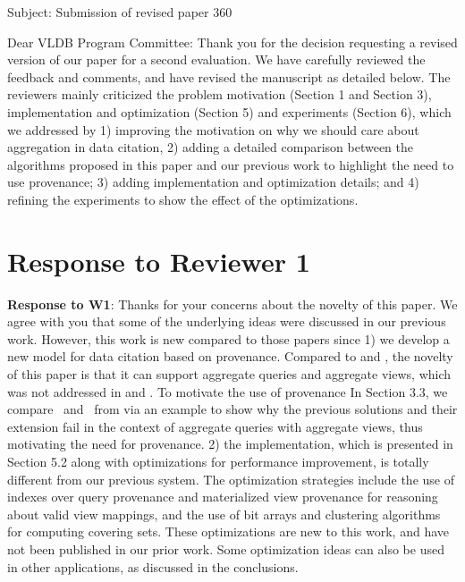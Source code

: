 \begin{appendix}
Subject: Submission of revised paper 360

Dear VLDB Program Committee:
Thank you for the decision requesting a revised version of our paper for a second evaluation. We have carefully reviewed the feedback and comments, and have revised the manuscript as detailed below. The reviewers mainly criticized the problem motivation (Section 1 and Section 3), implementation and optimization (Section 5) and experiments (Section 6), which we addressed by 1) improving the motivation on why we should care about aggregation in data citation, 2) adding a detailed comparison between the algorithms proposed in this paper and our previous work to highlight the need to use provenance; 3) adding implementation and optimization details; and 4) refining the experiments to show the effect of the optimizations.
 

\section{Response to Reviewer 1}

\textbf{Response to W1}: Thanks for your concerns about the novelty of this paper. We agree with you that some of the underlying ideas were discussed in our previous work. However, this work is new compared to those papers since 1) we develop a new model for data citation based on provenance. Compared to \cite{alawini2018data} and \cite{wu2018data}, the novelty of this paper is that it can support aggregate queries and aggregate views, which was not addressed in \cite{alawini2018data} and \cite{wu2018data}. To motivate the use of provenance In Section 3.3, we compare \pba\ and \rba\ from \cite{wu2018data} via an example to show why the previous solutions and their extension fail in the context of aggregate queries with aggregate views, thus motivating the need for provenance. 2) the implementation, which is presented in Section 5.2 along with optimizations for performance improvement,  is totally different from our previous system. The optimization strategies include the use of indexes over query provenance and materialized view provenance for reasoning about valid view mappings, and the use of bit arrays and clustering algorithms for computing covering sets. These optimizations are new to this work, and have not been published in our prior work. Some optimization ideas can also be used in other applications, as discussed in the conclusions.


\end{appendix}
